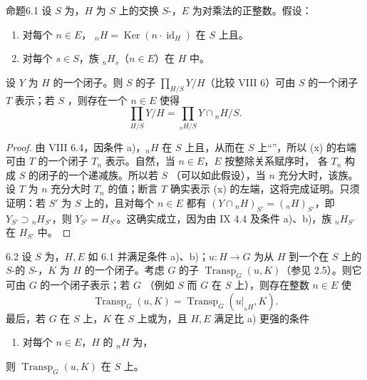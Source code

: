 \begin{SGAresult}{命题}{6.1}
设 $S$ 为，$H$ 为 $S$ 上的交换 $S$-，$E$ 为对乘法的正整数。假设：
\begin{enumerate}
\item[a)] 对每个 $n\in E$， ${}_nH=\operatorname{Ker}(n\cdot\operatorname{id}_H)$ 在 $S$ 上且。
\item[b)] 对每个 $s\in S$，族 ${}_nH_s$（$n\in E$）在 $H$ 中。
\end{enumerate}
设 $Y$ 为 $H$ 的一个闭子。则 $S$ 的子 $\prod_{H/S}Y/H$（比较 VIII 6）可由 $S$ 的一个闭子 $T$ 表示；若 $S$ ，则存在一个 $n\in E$ 使得
\[\tag{x}\prod_{H/S}Y/H=\prod_{{}_nH/S}Y\cap{}_nH/S.\]
\end{SGAresult}
\begin{proof}
由 VIII 6.4，因条件 a)，${}_nH$ 在 $S$ 上且，从而在 $S$ 上“”，所以 (x) 的右端可由 $T$ 的一个闭子 $T_n$ 表示。自然，当 $n\in E$，$E$ 按整除关系赋序时，
各 $T_n$ 构成 $S$ 的闭子的一个递减族。所以若 $S$ （可以如此假设），当 $n$ 充分大时，该族。设 $T$ 为 $n$ 充分大时 $T_n$ 的值；断言 $T$ 确实表示 (x) 的左端，这将完成证明。只须证明：若 $S'$ 为 $S$ 上的，且对每个 $n\in E$ 都有 $(Y\cap{}_nH)_{S'}=({}_nH)_{S'}$，即 $Y_{S'}\supset{}_nH_{S'}$，则 $Y_{S'}=H_{S'}$。这确实成立，因为由 IX 4.4 及条件 a)、b)，族 ${}_nH_{S'}$ 在 $H_{S'}$ 中。
\end{proof}
\begin{SGAresult}{}{6.2}
设 $S$ 为，$H,E$ 如 6.1 并满足条件 a)、b)；$u:H\to G$ 为从 $H$ 到一个在 $S$ 上的 $S$-的 $S$-，$K$ 为 $H$ 的一个闭子。考虑 $G$ 的子 $\operatorname{Transp}_G(u,K)$（参见 2.5）。则它可由 $G$ 的一个闭子表示；若 $G$ （例如 $S$ 而 $G$ 在 $S$ 上），则存在整数 $n\in E$ 使
\[\operatorname{Transp}_G(u,K)=\operatorname{Transp}_G(u|_{{}_nH},K).\]
最后，若 $G$ 在 $S$ 上，$K$ 在 $S$ 上或为，且 $H,E$ 满足比 a) 更强的条件
\begin{enumerate}
\item[a$'$)] 对每个 $n\in E$，$H$ 的 ${}_nH$ 为，
\end{enumerate}
则 $\operatorname{Transp}_G(u,K)$ 在 $S$ 上。
\end{SGAresult}
